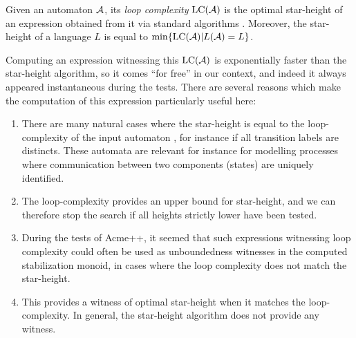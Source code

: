 Given an automaton $\mathcal{A}$, its \emph{loop complexity} $\mathrm{LC}(\mathcal{A})$ is the optimal star-height of an expression obtained from it via standard algorithms \cite{Eggan63}. Moreover, the star-height of a language $L$ is equal to $\min\{\mathrm{LC}(\mathcal{A})| L(\mathcal{A})=L\}$.

Computing an expression witnessing this $\mathrm{LC}(\mathcal{A})$ is exponentially faster than the star-height algorithm, so it comes ``for free'' in our context, and indeed it always appeared instantaneous during the tests.
There are several reasons which make the computation of this expression particularly useful here:

\begin{enumerate}
\item 
There are many natural cases where the star-height is equal to the loop-complexity of the input automaton \cite{Cohen70}, for instance if all transition labels are distincts. These automata are relevant for instance for modelling processes where communication between two components (states) are uniquely identified. 

\item 
The loop-complexity provides an upper bound for star-height, and we can therefore stop the search if all heights strictly lower have been tested.

\item During the tests of Acme++, it seemed that such expressions witnessing loop complexity could often be used as unboundedness witnesses in the computed stabilization monoid, in cases where the loop complexity does not match the star-height.

\item This provides a witness of optimal star-height when it matches the loop-complexity. In general, the star-height algorithm does not provide any witness.
\end{enumerate}
%

